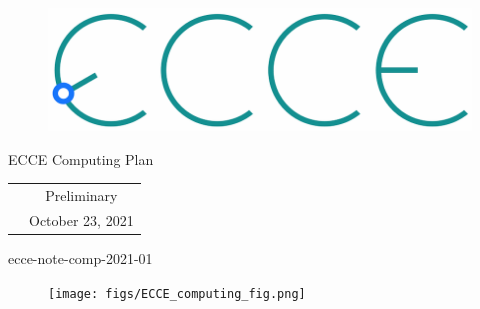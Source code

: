 \renewcommand*\familydefault{\sfdefault}
{\sffamily
\vfill
\vspace{4cm}
\begin{figure}[H]
  \begin{center}
  \includegraphics[width=0.3\linewidth]{figs/ecce-logo.png}
\end{center}
\end{figure}

\begin{center}
  \large
  {\LARGE{ECCE Computing Plan}}

  \begin{tabular}{cc}
& Preliminary
\\
&October 23, 2021 \\
  \end{tabular}
  \end{center}

\vspace{15cm}
\hspace*{0pt}\hfill ecce-note-comp-2021-01
\vspace{-15cm}

\vspace{1cm}

\begin{figure}[H]
  \begin{center}
    \texttt{[image: figs/ECCE\_computing\_fig.png]}
  \end{center}
\end{figure}
}


\vfill
\renewcommand*\familydefault{\rmdefault}
